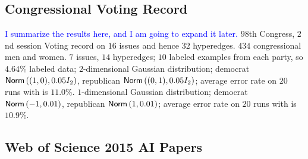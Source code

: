 \documentclass[letterpaper]{article} %
\begin{document}
\subsection{Congressional Voting Record}
\textcolor{blue}{I summarize the results here, and I am going to expand it later.}
$98$th Congress, $2$nd session
Voting record on $16$ issues and hence $32$ hyperedges.
$434$ congressional men and women. $7$ issues, $14$ hyperedges;
$10$ labeled examples from each party, so $4.64\%$ labeled data;
$2$-dimensional Gaussian distribution; democrat $\mathsf{Norm}\left((1, 0), 0.05I_2\right)$, republican $\mathsf{Norm}\left((0, 1), 0.05I_2\right)$; average error rate on $20$ runs with is $11.0\%$.
$1$-dimensional Gaussian distribution; democrat $\mathsf{Norm}\left(-1, 0.01\right)$, republican $\mathsf{Norm}\left(1, 0.01\right)$; average error rate on $20$ runs with is $10.9\%$.

\subsection{Web of Science 2015 AI Papers}

	
\end{document}
